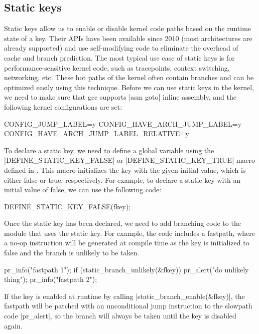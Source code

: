 \documentclass[10pt, oneside]{book}
\begin{document}
\subsection{Static keys}
\label{sec:static_keys}
Static keys allow us to enable or disable kernel code paths based on the runtime state of a key.
Their APIs have been available since 2010 (most architectures are already supported) and use self-modifying code to eliminate the overhead of cache and branch prediction.
The most typical use case of static keys is for performance-sensitive kernel code, such as tracepoints, context switching, networking, etc. These hot paths of the kernel often contain branches and can be optimized easily using this technique.
Before we can use static keys in the kernel, we need to make sure that gcc supports \cpp|asm goto| inline assembly, and the following kernel configurations are set:

\begin{code}
CONFIG_JUMP_LABEL=y
CONFIG_HAVE_ARCH_JUMP_LABEL=y
CONFIG_HAVE_ARCH_JUMP_LABEL_RELATIVE=y
\end{code}

To declare a static key, we need to define a global variable using the \cpp|DEFINE_STATIC_KEY_FALSE| or \cpp|DEFINE_STATIC_KEY_TRUE| macro defined in .
This macro initializes the key with the given initial value, which is either false or true, respectively. For example, to declare a static key with an initial value of false, we can use the following code:

\begin{code}
DEFINE_STATIC_KEY_FALSE(fkey);
\end{code}

Once the static key has been declared, we need to add branching code to the module that uses the static key.
For example, the code includes a fastpath, where a no-op instruction will be generated at compile time as the key is initialized to false and the branch is unlikely to be taken.

\begin{code}
pr_info("fastpath 1\n");
if (static_branch_unlikely(&fkey))
    pr_alert("do unlikely thing\n");
pr_info("fastpath 2\n");
\end{code}

If the key is enabled at runtime by calling \cpp|static_branch_enable(&fkey)|, the fastpath will be patched with an unconditional jump instruction to the slowpath code \cpp|pr_alert|, so the branch will always be taken until the key is disabled again.
\end{document}
